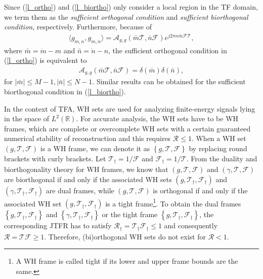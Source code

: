 \documentclass[journal]{IEEEtran}
\begin{document}
Since (\ref{l_ortho}) and (\ref{l_biortho}) only consider a local region in the TF domain, we term them as the {\emph{sufficient orthogonal
      condition} and \emph{sufficient biorthogonal condition}}, respectively.
Furthermore, because of
\begin{align}
  \langle g_{m,n}, g_{\dot m,\dot n}\rangle
  = \mathcal A_{g,g} (\bar m \mathcal T, \bar n \mathcal F)e^{j2\pi n\bar m \mathcal F \mathcal T},
\end{align}
where $\bar m= \dot m-m$ and $\bar n= \dot n-n$, the sufficient orthogonal condition in (\ref{l_ortho}) is equivalent to
\begin{align}\label{agg}
  \mathcal A_{g,g}(\bar m\mathcal T, \bar n\mathcal F)=\delta(\bar m)\delta(\bar n),
\end{align}
for $|\bar m| \le M-1, |\bar n| \le N-1$. Similar results can be obtained for the sufficient biorthogonal condition in (\ref{l_biortho}). %


In the context of TFA, WH sets are used for analyzing finite-energy signals lying in the space of $L^2(\mathbb R)$. For accurate analysis, %
the WH sets have to be WH frames, which are complete or overcomplete WH sets with a certain guaranteed numerical stability of reconstruction and this requires $\mathcal R\le 1$\cite{gaborana,ftfa}.
When a WH set $\left(g,\mathcal T, \mathcal F\right)$ is a WH frame, we can denote it as $\left\{g,\mathcal T, \mathcal F\right\}$ by replacing round brackets with curly brackets.
Let $\mathcal T_{\dagger}= 1/\mathcal F$ and $\mathcal F_{\dagger}= 1/\mathcal T$.
From the duality and biorthogonality theory for WH frames\cite{wexler1990,janssen1995,daubechies95}, we know that {$\left(g,\mathcal T, \mathcal F\right)$} and {$\left(\gamma,\mathcal T, \mathcal F\right)$} are biorthogonal if and only if the associated WH sets $(g,\mathcal T_{\dagger}, \mathcal F_{\dagger})$ and $(\gamma,\mathcal T_{\dagger}, \mathcal F_{\dagger})$ are dual frames,
while {$\left(g,\mathcal T, \mathcal F\right)$} is orthogonal if and only if the associated WH set $(g,\mathcal T_{\dagger}, \mathcal F_{\dagger})$ is a tight frame\footnote{A WH frame is called tight if its lower and upper frame bounds are the same.}.
To obtain the dual frames $\left\{g,\mathcal T_{\dagger}, \mathcal F_{\dagger}\right\}$ and  $\left\{\gamma,\mathcal T_{\dagger}, \mathcal F_{\dagger}\right\}$ or the tight frame
$\left\{g,\mathcal T_{\dagger}, \mathcal F_{\dagger}\right\}$, the corresponding JTFR  has to satisfy $\mathcal R_{\dagger}=\mathcal T_{\dagger}\mathcal F_{\dagger} \le 1$ and consequently $\mathcal R=\mathcal T \mathcal F \ge 1$. Therefore, (bi)orthogonal WH sets do not exist for $\mathcal R <1$.
\end{document}
